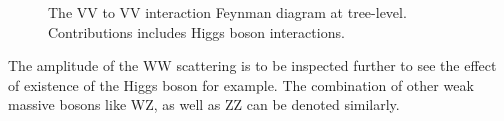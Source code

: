 \begin{figure}[tbp]
\begin{center}
\caption{
The VV to VV interaction Feynman diagram at tree-level. Contributions includes Higgs boson interactions.
}
\label{fig:VBSHiggs}
\end{center}
\end{figure}


The amplitude of the WW scattering is to be inspected further to see the effect of existence of the Higgs boson for example. The combination of other weak massive bosons like WZ, as well as ZZ can be denoted similarly. 

